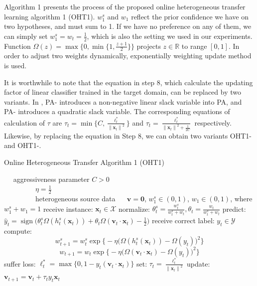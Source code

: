 \documentclass{article} %
\theoremstyle{remark}
\theoremstyle{definition}
\DeclareMathOperator{\sign}{sign}
\begin{document}
Algorithm 1 presents the process of the proposed online heterogeneous transfer learning algorithm 1 (OHT1).
$w_{1}^{s}$ and $w_1$ reflect the prior confidence we have on two hypotheses, and must sum to 1.
If we have no preference on any of them, we can simply set $w_{1}^{s} = w_{t} = \frac{1}{2}$, which is also the setting we used in our experiments.
Function $\varOmega(z) = \max \{ 0, \min \{ 1, \frac{z+1}{2} \}\}$ projects $z \in \mathbb{R}$ to range $[0,1]$.
In order to adjust two weights dynamically, exponentially weighting update method \cite{cesa2006prediction} is used.

It is worthwhile to note that the equation in step 8, which calculate the updating factor of linear classifier trained in the target domain, can be replaced by two variants.
In \cite{crammer2006online}, PA-\uppercase\expandafter{} introduces a non-negative linear slack variable into PA, and PA-\uppercase\expandafter{} introduces a quadratic slack variable.
The corresponding equations of calculation of $\tau$ are $\tau_t = \min \{ C, \frac{\ell_{t}^{*}}{{\|\mathbf{x}_t\|}^2} \} $ and $ \tau_t = \frac{\ell_{t}^{*}}{{\|\mathbf{x}_t\|}^2 + \frac{1}{2C}} $ respectively.
Likewise, by replacing the equation in Step 8, we can obtain two variants OHT1-\uppercase\expandafter{} and OHT1-\uppercase\expandafter{}.

\begin{algorithm}
\begin{algorithmic}[1]
\caption{Online Heterogeneous Transfer Algorithm 1 (OHT1)}
\REQUIRE ~~
aggressiveness parameter $C>0$\\ 
~~~~~~~~~$\eta = \frac{1}{2}$ \\
~~~~~~~~~heterogeneous source data
\ENSURE ~~
$\mathbf{v} = \mathbf{0}$, $w_{1}^{s} \in (0,1)$, $w_{1} \in (0,1)$, where $w_{1}^{s} + w_1 = 1$
\STATE 
  receive instance: $\mathbf{x}_t \in \mathcal{X}$
\STATE
  normalize: $\theta_{t}^{s} = \frac{w_{t}^{s}}{w_{t}^{s}+w_t}, \theta_{t} = \frac{w_{t}}{w_{t}^{s}+w_t}$
\STATE
  predict: $\hat{y}_t = \sign \big( \theta_{t}^{s} \varOmega (h_{t}^{s}(\mathbf{x}_t)) + \theta_{t} \varOmega (\mathbf{v}_t \cdot \mathbf{x}_t) - \frac{1}{2} \big)$
\STATE
  receive correct label: $y_t \in \mathcal{Y}$
\STATE
  compute: 
    $$w_{t+1}^{s} = w_{t}^{s} \exp \big\{ -\eta \big(\varOmega(h_{t}^{s}(\mathbf{x}_t)) - \varOmega(y_t)\big)^2 \big\} $$
    $$w_{t+1} = w_{t} \exp \big\{ -\eta \big(\varOmega(\mathbf{v}_t \cdot \mathbf{x}_t) - \varOmega(y_t)\big)^2 \big\} $$
\STATE
  suffer loss: $\ell_{t}^{*} = \max \{0, 1-y_t(\mathbf{v}_t \cdot \mathbf{x}_t)\}$
\STATE
  set: $\tau_t = \frac{\ell_{t}^{*}}{{\|\mathbf{x}_t\|}^2}$
\STATE
  update: $ \mathbf{v}_{t+1} = \mathbf{v}_t + \tau_t y_t \mathbf{x}_t $
\ENDFOR
\end{algorithmic}
\end{algorithm}
\end{document}
